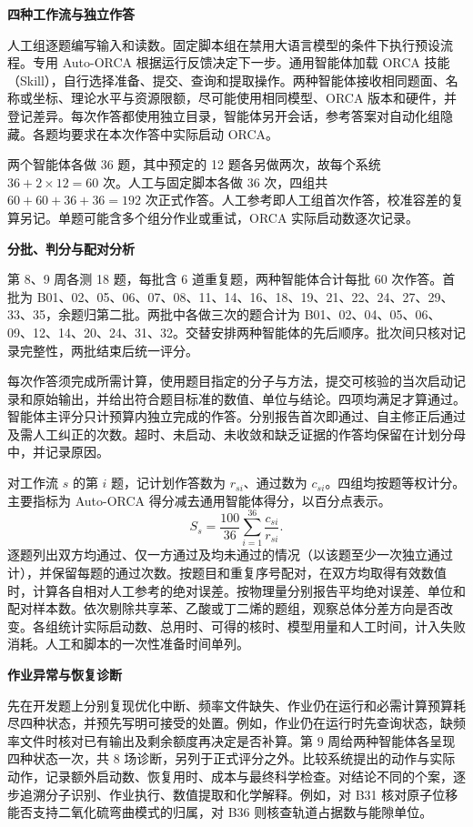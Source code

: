 \documentclass[12pt,a4paper]{article}
\newcommand{\subhead}[1]{\par\addvspace{0.38em}\textbf{#1}\par\nobreak}
\begin{document}
\subhead{四种工作流与独立作答}
人工组逐题编写输入和读数。固定脚本组在禁用大语言模型的条件下执行预设流程。专用 Auto-ORCA 根据运行反馈决定下一步。通用智能体加载 ORCA 技能（Skill），自行选择准备、提交、查询和提取操作。两种智能体接收相同题面、名称或坐标、理论水平与资源限额，尽可能使用相同模型、ORCA 版本和硬件，并登记差异。每次作答都使用独立目录，智能体另开会话，参考答案对自动化组隐藏。各题均要求在本次作答中实际启动 ORCA。

两个智能体各做 36 题，其中预定的 12 题各另做两次，故每个系统 $36+2\times12=60$ 次。人工与固定脚本各做 36 次，四组共 $60+60+36+36=192$ 次正式作答。人工参考即人工组首次作答，校准容差的复算另记。单题可能含多个组分作业或重试，ORCA 实际启动数逐次记录。

\clearpage
\subhead{分批、判分与配对分析}
第 8、9 周各测 18 题，每批含 6 道重复题，两种智能体合计每批 60 次作答。首批为 B01、02、05、06、07、08、11、14、16、18、19、21、22、24、27、29、33、35，余题归第二批。两批中各做三次的题合计为 B01、02、04、05、06、09、12、14、20、24、31、32。交替安排两种智能体的先后顺序。批次间只核对记录完整性，两批结束后统一评分。

每次作答须完成所需计算，使用题目指定的分子与方法，提交可核验的当次启动记录和原始输出，并给出符合题目标准的数值、单位与结论。四项均满足才算通过。智能体主评分只计预算内独立完成的作答。分别报告首次即通过、自主修正后通过及需人工纠正的次数。超时、未启动、未收敛和缺乏证据的作答均保留在计划分母中，并记录原因。

对工作流 $s$ 的第 $i$ 题，记计划作答数为 $r_{si}$、通过数为 $c_{si}$。四组均按题等权计分。主要指标为 Auto-ORCA 得分减去通用智能体得分，以百分点表示。
\[
 S_s=\frac{100}{36}\sum_{i=1}^{36}\frac{c_{si}}{r_{si}} .
\]
逐题列出双方均通过、仅一方通过及均未通过的情况（以该题至少一次独立通过计），并保留每题的通过次数。按题目和重复序号配对，在双方均取得有效数值时，计算各自相对人工参考的绝对误差。按物理量分别报告平均绝对误差、单位和配对样本数。依次剔除共享苯、乙酸或丁二烯的题组，观察总体分差方向是否改变。各组统计实际启动数、总用时、可得的核时、模型用量和人工时间，计入失败消耗。人工和脚本的一次性准备时间单列。

\subhead{作业异常与恢复诊断}
先在开发题上分别复现优化中断、频率文件缺失、作业仍在运行和必需计算预算耗尽四种状态，并预先写明可接受的处置。例如，作业仍在运行时先查询状态，缺频率文件时核对已有输出及剩余额度再决定是否补算。第 9 周给两种智能体各呈现四种状态一次，共 8 场诊断，另列于正式评分之外。比较系统提出的动作与实际动作，记录额外启动数、恢复用时、成本与最终科学检查。对结论不同的个案，逐步追溯分子识别、作业执行、数值提取和化学解释。例如，对 B31 核对原子位移能否支持二氧化硫弯曲模式的归属，对 B36 则核查轨道占据数与能隙单位。
\end{document}
